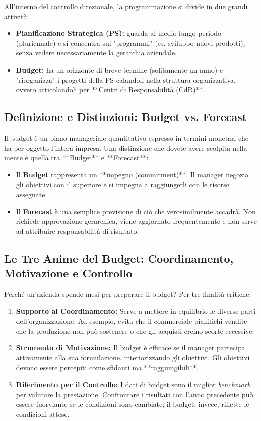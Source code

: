 \documentclass[a4paper,10pt]{article}
\begin{document}
All'interno del controllo direzionale, la programmazione si divide in due grandi attività:
\begin{itemize}
    \item \textbf{Pianificazione Strategica (PS):} guarda al medio-lungo periodo (pluriennale) e si concentra sui "programmi" (es. sviluppo nuovi prodotti), senza vedere necessariamente la gerarchia aziendale.
    \item \textbf{Budget:} ha un orizzonte di breve termine (solitamente un anno) e "riorganizza" i progetti della PS calandoli nella struttura organizzativa, ovvero articolandoli per **Centri di Responsabilità (CdR)**.
\end{itemize}

\subsection*{Definizione e Distinzioni: Budget vs. Forecast}

Il budget è un piano manageriale quantitativo espresso in termini monetari che ha per oggetto l'intera impresa. Una distinzione che dovete avere scolpita nella mente è quella tra **Budget** e **Forecast**:
\begin{itemize}
    \item Il \textbf{Budget} rappresenta un **impegno (commitment)**. Il manager negozia gli obiettivi con il superiore e si impegna a raggiungerli con le risorse assegnate.
    \item Il \textbf{Forecast} è una semplice previsione di ciò che verosimilmente accadrà. Non richiede approvazione gerarchica, viene aggiornato frequentemente e non serve ad attribuire responsabilità di risultato.
\end{itemize}

\subsection*{Le Tre Anime del Budget: Coordinamento, Motivazione e Controllo}

Perché un'azienda spende mesi per preparare il budget? Per tre finalità critiche:
\begin{enumerate}
    \item \textbf{Supporto al Coordinamento:} Serve a mettere in equilibrio le diverse parti dell'organizzazione. Ad esempio, evita che il commerciale pianifichi vendite che la produzione non può sostenere o che gli acquisti creino scorte eccessive.
    \item \textbf{Strumento di Motivazione:} Il budget è efficace se il manager partecipa attivamente alla sua formulazione, interiorizzando gli obiettivi. Gli obiettivi devono essere percepiti come sfidanti ma **raggiungibili**.
    \item \textbf{Riferimento per il Controllo:} I dati di budget sono il miglior \textit{benchmark} per valutare la prestazione. Confrontare i risultati con l'anno precedente può essere fuorviante se le condizioni sono cambiate; il budget, invece, riflette le condizioni attese.
\end{enumerate}
\end{document}
